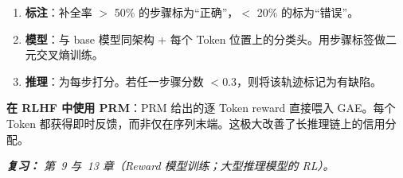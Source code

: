 \begin{questionbox}
\begin{enumerate}
\begin{itemize}
  \item 对每道题，逐步生成推理轨迹。
  \item 在每一步 $k$，从该步出发把解完整补全 $M$ 次（$M=32$）。
  \item 步骤分数 = 抵达正确答案的补全比例。
  \item 分数明显下降的步骤 = “出错”的步骤。
\end{itemize}
  \item \textbf{标注}：补全率 $>$ 50\% 的步骤标为“正确”，$<$ 20\% 的标为“错误”。
  \item \textbf{模型}：与 base 模型同架构 + 每个 Token 位置上的分类头。用步骤标签做二元交叉熵训练。
  \item \textbf{推理}：为每步打分。若任一步骤分数 $<$0.3，则将该轨迹标记为有缺陷。
\end{enumerate}

\textbf{在 RLHF 中使用 PRM}：PRM 给出的逐 Token reward 直接喂入 GAE。每个 Token 都获得即时反馈，而非仅在序列末端。这极大改善了长推理链上的信用分配。

\emph{\textbf{复习：} 第~9 与~13 章（Reward 模型训练；大型推理模型的 RL）。}
\end{questionbox}

